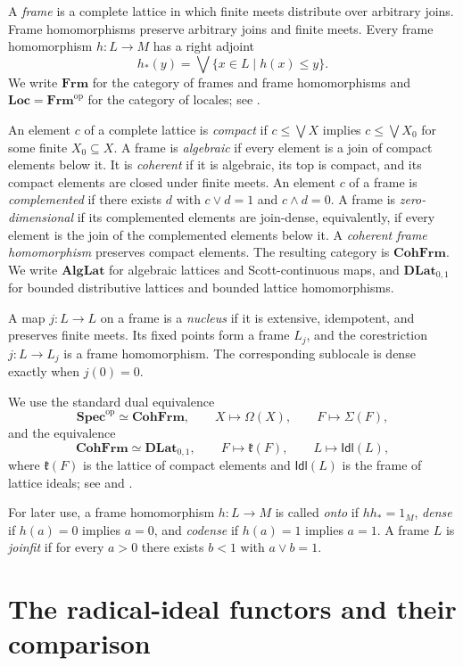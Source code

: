 \documentclass[12pt,leqno]{amsart}
\newcommand{\SpecSp}{\mathbf{Spec}}
\newcommand{\CohFrm}{\mathbf{CohFrm}}
\newcommand{\Frm}{\mathbf{Frm}}
\newcommand{\Loc}{\mathbf{Loc}}
\newcommand{\AlgLat}{\mathbf{AlgLat}}
\newcommand{\DLat}{\mathbf{DLat}_{0,1}}
\newcommand{\op}{\mathrm{op}}
\theoremstyle{definition}
\numberwithin{equation}{section}
\theoremstyle{remark}
\def\leq{\leqslant}
\begin{document}
A \emph{frame} is a complete lattice in which finite meets distribute over arbitrary joins. Frame homomorphisms preserve arbitrary joins and finite meets. Every frame homomorphism \(h\colon L\to M\) has a right adjoint
\[
h_*(y)=\bigvee\{x\in L\mid h(x)\leq y\}.
\]
We write \(\Frm\) for the category of frames and frame homomorphisms and \(\Loc=\Frm^{\op}\) for the category of locales; see \cite{Johnstone,Picado}.

An element $c$ of a complete lattice is \emph{compact} if
\(c\leq\bigvee X\) implies \(c\leq\bigvee X_0\) for some finite \(X_0\subseteq X\). A frame is \emph{algebraic} if every element is a join of compact elements below it. It is \emph{coherent} if it is algebraic, its top is compact, and its compact elements are closed under finite meets. An element $c$ of a frame is \emph{complemented} if there exists $d$ with \(c\vee d=1\) and \(c\wedge d=0\). A frame is \emph{zero-dimensional} if its complemented elements are join-dense, equivalently, if every element is the join of the complemented elements below it. A \emph{coherent frame homomorphism} preserves compact elements. The resulting category is \(\CohFrm\). We write \(\AlgLat\) for algebraic lattices and Scott-continuous maps, and \(\DLat\) for bounded distributive lattices and bounded lattice homomorphisms.

A map \(j\colon L\to L\) on a frame is a \emph{nucleus} if it is extensive, idempotent, and preserves finite meets. Its fixed points form a frame \(L_j\), and the corestriction \(j\colon L\to L_j\) is a frame homomorphism. The corresponding sublocale is dense exactly when \(j(0)=0\).

We use the standard dual equivalence
\[
\SpecSp^{\op}\simeq\CohFrm,
\qquad
X\longmapsto\Omega(X),
\qquad
F\longmapsto\Sigma(F),
\]
and the equivalence
\[
\CohFrm\simeq\DLat,
\qquad
F\longmapsto\mathfrak k(F),
\qquad
L\longmapsto\mathsf{Idl}(L),
\]
where \(\mathfrak k(F)\) is the lattice of compact elements and \(\mathsf{Idl}(L)\) is the frame of lattice ideals; see \cite[Chapter~II]{Johnstone} and \cite[Chapter~II]{Picado}.

For later use, a frame homomorphism \(h\colon L\to M\) is called \emph{onto} if \(hh_*=1_M\), \emph{dense} if \(h(a)=0\) implies \(a=0\), and \emph{codense} if \(h(a)=1\) implies \(a=1\). A frame $L$ is \emph{joinfit} if for every \(a>0\) there exists \(b<1\) with \(a\vee b=1\).

\section{The radical-ideal functors and their comparison}\label{sec:radical-functors}
\end{document}
